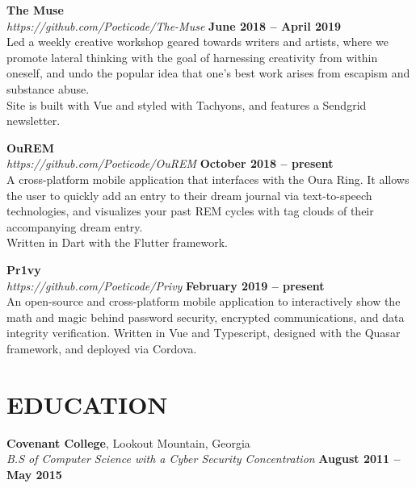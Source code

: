 \documentclass[margin,line]{resume}
\begin{document}
\begin{resume}
    \textbf{\listing The Muse}\\
    \textsl{https://github.com/Poeticode/The-Muse} \hfill \textbf{June 2018 -- April 2019}\\
    Led a weekly creative workshop geared towards writers and artists, where we promote lateral thinking with the goal of harnessing creativity from within oneself, and undo the popular idea that one's best work arises from escapism and substance abuse.\\
    Site is built with Vue and styled with Tachyons, and features a Sendgrid newsletter.

    \textbf{\listing OuREM}\\
    \textsl{https://github.com/Poeticode/OuREM} \hfill \textbf{October 2018 -- present}\\
    A cross-platform mobile application that interfaces with the Oura Ring. It allows the user to quickly add an entry to their dream journal via text-to-speech technologies, and visualizes your past REM cycles with tag clouds of their accompanying dream entry.\\
    Written in Dart with the Flutter framework.

    \textbf{\listing Pr1vy}\\
    \textsl{https://github.com/Poeticode/Privy} \hfill \textbf{February 2019 -- present}\\
    An open-source and cross-platform mobile application to interactively show the math and magic behind password security, encrypted communications, and data integrity verification. Written in Vue and Typescript, designed with the Quasar framework, and deployed via Cordova.

    \vspace{-1mm}

\sectionline


    \section{\mysidestyle \textbf{\large{E}\small{DUCATION}}}

    \textbf{\listing Covenant College}, Lookout Mountain, Georgia \vspace{1mm}\\
    \textsl{B.S of Computer Science with a Cyber Security Concentration} \hfill \textbf{August 2011 -- May 2015}\vspace{-3mm}\\\vspace{-1mm}%


\end{resume}
\end{document}
